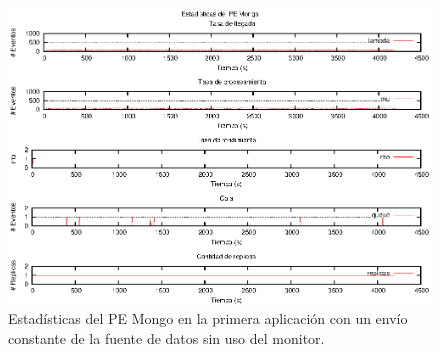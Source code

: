 \begin{figure}[p]
\centering
    \includegraphics[scale=1.1]{images/exp/app1/uniform/sm/statusMongoPE.eps}
    \caption{Estadísticas del PE Mongo en la primera aplicación con un envío constante de la fuente de datos sin uso del monitor.}
    \label{fig:app1-uniform-statusMongoPE-sm}
\end{figure}

